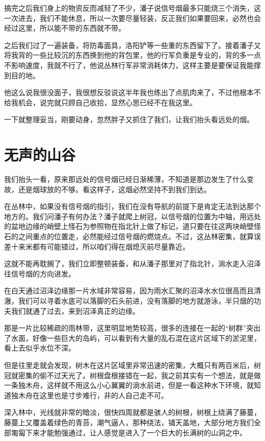 搞完之后我们身上的物资反而减轻了不少，潘子说信号烟最多只能烧三个消失，这一次进去，我们不能休息，所以一次要尽量轻装，反正我们如果要回来，必然也会经过这里，所以能不带的东西就不带。

之后我们过了一遍装备，将防毒面具，洛阳铲等一些重的东西留下了。接着潘子又将我背的一些比较沉的东西换到他的背包里，他的行军负重是专业的，背的多一点不影响速度，我就不行了，他说丛林行军非常消耗体力，这样主要是要保证我能撑到目的地。

他这么说我很没面子，我很想反驳说这半年我也练出了点肌肉来了，不过他根本不给我机会，说完就只顾自己收拾，显然心思已经不在我这里。

一下就整理妥当，刚要动身，忽然胖子又抓住了我们，让我们抬头看远处的烟。

\chapter{无声的山谷}

我们抬头一看，原来那远处的信号烟已经日渐稀薄，不知道是那边发生了什么变故，还是烟球放的不够。看这样子，这烟必然坚持不到我们到达。

在丛林中，如果没有信号烟的指引，我们在没有导航的前提下是肯定无法到达那个地方的。我们问潘子有何办法？潘子就爬上树冠，以信号烟的位置为中轴，用远处的盆地边缘的峭壁上怪石为参照物在指北针上做了标记，道只要在往这两块峭壁怪石的之间重点的位置走，必然能经过信号烟的燃烧点。不过，这丛林密集，就算误差十来米都有可能错过，所以咱们得在烟熄灭前尽量靠近。

这就不能再耽搁了，我们立即整顿装备，和从潘子那里对了指北针，淌水走入沼泽往信号烟的方向进发。

在白天通过沼泽边缘那一片水域非常容易，因为雨水汇聚的沼泽水水位很高而且清澈，我们可以寻着水底可以落脚的石头前进，没有落脚的地方就游泳，半只烟的功夫我们就通了过去，来到沼泽真正的边缘。

那是一片比较稀疏的雨林带，这里明显地势较高，很多的连接在一起的“树群”突出了水面，好像一些巨大的岛屿，可以看到有大量的乱石混在这片区域下的淤泥里，看上去似乎水位不深。

但是往里走就会发现，树木在这片区域里非常迅速的密集，大概只有两百米后，树冠就密集的偷不过天光了。树根盘根接错在一起，我之前其实有一个想法，就是做一条独木舟，这样就不用这么小心翼翼的淌水前进，但是一看这种水下环境，就知道独木舟在这里也是寸步难行，非的人自己走不可。

深入林中，光线就非常的暗淡，很快四周就都是骇人的树根，树根上绕满了藤蔓，藤蔓上又覆盖着绿色的青苔，潮气逼人，那种绕法，铺天盖地，大部分地方我们全部匍匐下来才能勉强通过，让人感觉是进入了一个巨大的长满树的山洞之中。

